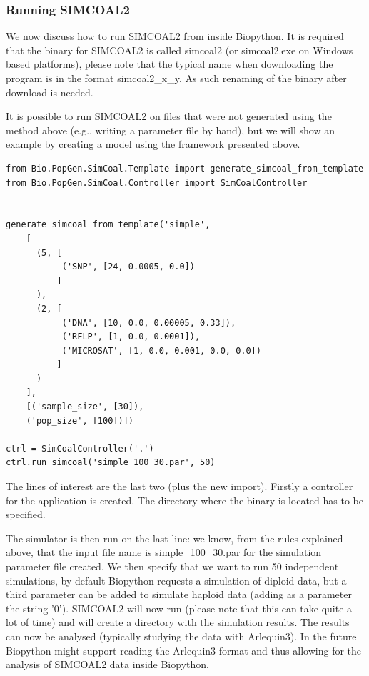 \documentclass{report}
\begin{document}
\subsubsection{Running SIMCOAL2}

We now discuss how to run SIMCOAL2 from inside Biopython. It is required
that the binary for SIMCOAL2 is called simcoal2 (or simcoal2.exe on Windows
based platforms), please note that the typical name when downloading the
program is in the format simcoal2\_x\_y. As such renaming of the binary
after download is needed.

It is possible to run SIMCOAL2 on files that were not generated using the method
above (e.g., writing a parameter file by hand), but we will show an
example by creating a model using the framework presented above.

\begin{verbatim}
from Bio.PopGen.SimCoal.Template import generate_simcoal_from_template
from Bio.PopGen.SimCoal.Controller import SimCoalController


generate_simcoal_from_template('simple',
    [
      (5, [
           ('SNP', [24, 0.0005, 0.0])
          ]
      ),
      (2, [
           ('DNA', [10, 0.0, 0.00005, 0.33]),
           ('RFLP', [1, 0.0, 0.0001]),
           ('MICROSAT', [1, 0.0, 0.001, 0.0, 0.0])
          ]
      )
    ],
    [('sample_size', [30]),
    ('pop_size', [100])])

ctrl = SimCoalController('.')
ctrl.run_simcoal('simple_100_30.par', 50)
\end{verbatim}

The lines of interest are the last two (plus the new import).
Firstly a controller for the
application is created. The directory where the binary is located has
to be specified.

The simulator is then run on the last line: we know, from the rules explained
above, that the input file name is simple\_100\_30.par for the
simulation parameter file created. We then specify
that we want to run 50 independent simulations, by default Biopython
requests a simulation of diploid data, but a third parameter can
be added to simulate haploid data (adding as a parameter the
string '0'). SIMCOAL2 will now run (please
note that this can take quite a lot of time) and will create a directory
with the simulation results. The results can now be analysed (typically
studying the data with Arlequin3). In the future Biopython might support
reading the Arlequin3 format and thus allowing for the analysis of SIMCOAL2
data inside Biopython.
\end{document}
